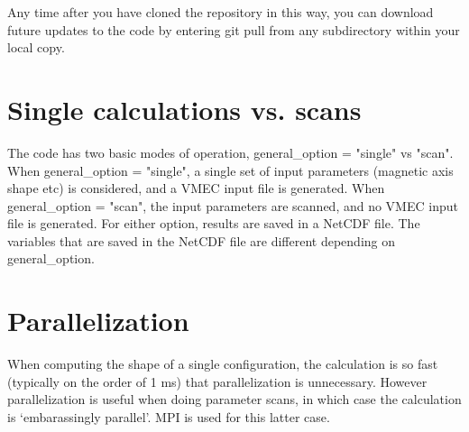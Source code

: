 Any time after you have cloned the repository in this way, you can download future updates to the code by entering {\ttfamily git pull} from any subdirectory within your local copy.



\section{Single calculations vs. scans}

The code has two basic modes of operation, {\ttfamily general\_option = "single"} vs {\ttfamily "scan"}. 
When {\ttfamily general\_option = "single"}, a single set of input parameters (magnetic axis shape etc) is
considered, and a VMEC input file is generated. When {\ttfamily general\_option = "scan"},
the input parameters are scanned, and no VMEC input file is generated. For either option, results
are saved in a NetCDF file. The variables that are saved in the NetCDF file are different depending on
{\ttfamily general\_option}.

\section{Parallelization}

When computing the shape of a single configuration, the calculation is so fast (typically on the order of 1 ms)
that parallelization is unnecessary. However parallelization is useful when doing parameter scans,
in which case the calculation is `embarassingly parallel'. MPI is used for this latter case.


%
%

